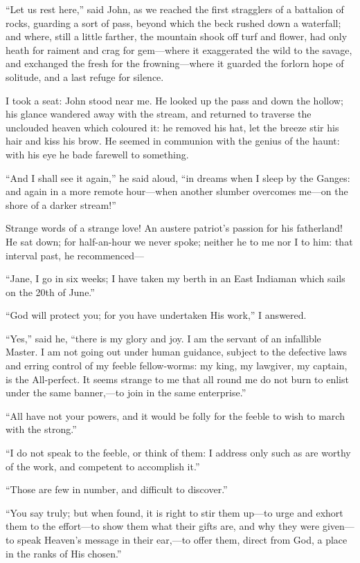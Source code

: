 \enquote{Let us rest here,} said \St{} John, as we reached the first
stragglers of a battalion of rocks, guarding a sort of pass, beyond
which the beck rushed down a waterfall; and where, still a little
farther, the mountain shook off turf and flower, had only heath for
raiment and crag for gem---where it exaggerated the wild to the savage,
and exchanged the fresh for the frowning---where it guarded the forlorn
hope of solitude, and a last refuge for silence.

I took a seat: \St{} John stood near me. He looked up the pass and down
the hollow; his glance wandered away with the stream, and returned to
traverse the unclouded heaven which coloured it: he removed his hat, let
the breeze stir his hair and kiss his brow. He seemed in communion with
the genius of the haunt: with his eye he bade farewell to something.

\enquote{And I shall see it again,} he said aloud, \enquote{in dreams
when I sleep by the Ganges: and again in a more remote hour---when
another slumber overcomes me---on the shore of a darker stream!}

Strange words of a strange love! An austere patriot's passion for his
fatherland! He sat down; for half-an-hour we never spoke; neither he to
me nor I to him: that interval past, he recommenced---

\enquote{Jane, I go in six weeks; I have taken my berth in an East
Indiaman which sails on the 20th of June.}

\enquote{God will protect you; for you have undertaken His work,} I
answered.

\enquote{Yes,} said he, \enquote{there is my glory and joy. I am the
servant of an infallible Master. I am not going out under human
guidance, subject to the defective laws and erring control of my feeble
fellow-worms: my king, my lawgiver, my captain, is the All-perfect. It
seems strange to me that all round me do not burn to enlist under the
same banner,---to join in the same enterprise.}

\enquote{All have not your powers, and it would be folly for the feeble
to wish to march with the strong.}

\enquote{I do not speak to the feeble, or think of them: I address only
such as are worthy of the work, and competent to accomplish it.}

\enquote{Those are few in number, and difficult to discover.}

\enquote{You say truly; but when found, it is right to stir them up---to
urge and exhort them to the effort---to show them what their gifts are,
and why they were given---to speak Heaven's message in their ear,---to
offer them, direct from God, a place in the ranks of His chosen.}

